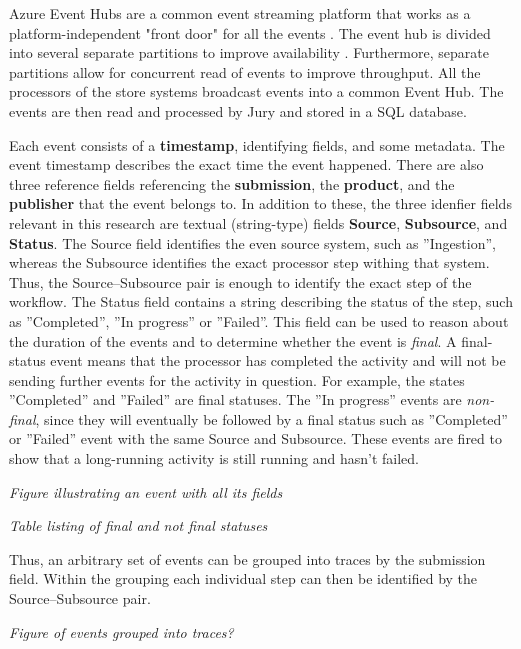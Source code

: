 \documentclass[english,12pt,a4paper,pdftex,sci,utf8]{aaltothesis}
\theoremstyle{definition}
\newcommand{\nyi}[1]{\noindent\colorbox{nyibg}{\textcolor{nyitext}{\emph{#1}}}}
\begin{document}
Azure Event Hubs are a common event streaming platform that works as a platform-independent "front door" for all the events \cite{eventhubs}. 
The event hub is divided into several separate partitions to improve availability \cite{eventhubavail}.
Furthermore, separate partitions allow for concurrent read of events to improve throughput.
All the processors of the store systems broadcast events into a common Event Hub.
The events are then read and processed by Jury and stored in a SQL database.

Each event consists of a \textbf{timestamp}, identifying fields, and some metadata. 
The event timestamp describes the exact time the event happened. There are also three reference fields referencing the \textbf{submission}, the \textbf{product}, and the \textbf{publisher} that the event belongs to. 
In addition to these, the three idenfier fields relevant in this research are textual (string-type) fields \textbf{Source}, \textbf{Subsource}, and \textbf{Status}. 
The Source field identifies the even source system, such as ''Ingestion'', whereas the Subsource identifies the exact processor step withing that system. 
Thus, the Source--Subsource pair is enough to identify the exact step of the workflow. 
The Status field contains a string describing the status of the step, such as ''Completed'', ''In progress'' or ''Failed''. 
This field can be used to reason about the duration of the events and to determine whether the event is \emph{final}. 
A final-status event means that the processor has completed the activity and will not be sending further events for the activity in question.
For example, the states ''Completed'' and ''Failed'' are final statuses.
The ''In progress'' events are \emph{non-final}, since they will eventually be followed by a final status such as ''Completed'' or ''Failed'' event with the same Source and Subsource.
These events are fired to show that a long-running activity is still running and hasn't failed.

\nyi{Figure illustrating an event with all its fields}

\nyi{Table listing of final and not final statuses}

Thus, an arbitrary set of events can be grouped into traces by the submission field. Within the grouping each individual step can then be identified by the Source--Subsource pair.

\nyi{Figure of events grouped into traces?}
\end{document}

